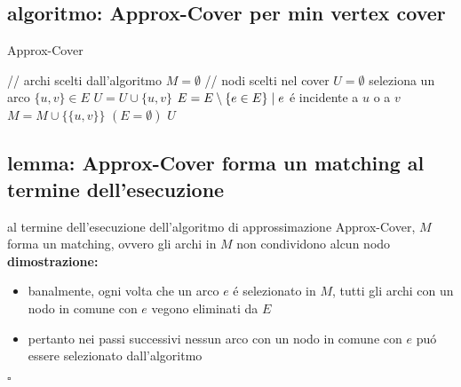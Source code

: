 
\subsection*{algoritmo: Approx-Cover per min vertex cover}
\begin{flushleft}
	\begin{algorithm}
		\caption{Approx-Cover}
		\begin{algorithmic}
			\STATE \color{gray} // archi scelti dall'algoritmo \color{black}
			\STATE $M=\emptyset$
			\STATE \color{gray} // nodi scelti nel cover \color{black}
			\STATE $U=\emptyset$
			\REPEAT
				\STATE seleziona un arco $\{u,v\}\in E$
				\STATE $U=U\cup\{u,v\}$
				\STATE $E=E\setminus\{e\in E\}\hspace{0.1cm}\vert\hspace{0.1cm}e$ \'e incidente a $u$ o a $v$
				\STATE $M=M\cup\{\{u,v\}\}$
			\UNTIL $(E=\emptyset)$
			\RETURN $U$
		\end{algorithmic}
	\end{algorithm}
\end{flushleft}


\subsection*{lemma: Approx-Cover forma un matching al termine dell'esecuzione}
\begin{flushleft}
	al termine dell'esecuzione dell'algoritmo di approssimazione Approx-Cover, $M$ forma un matching, ovvero gli archi in $M$ non condividono alcun nodo \newline \\
	\textbf{dimostrazione:}
	\begin{itemize}
		\item banalmente, ogni volta che un arco $e$ \'e selezionato in $M$, tutti gli archi con un nodo in comune con $e$ vegono eliminati da $E$
		\item pertanto nei passi successivi nessun arco con un nodo in comune con $e$ pu\'o essere selezionato dall'algoritmo
	\end{itemize}
	\hfill$\square$
\end{flushleft}

